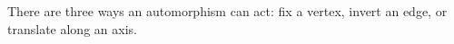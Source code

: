 \documentclass[preview]{standalone}
\begin{document}
\begin{center}
There are three ways an automorphism can act: fix a vertex, invert an edge, or translate along an axis.
\end{center}
\end{document}
